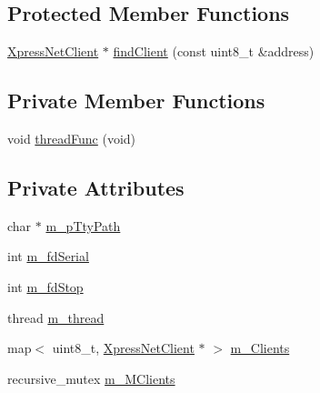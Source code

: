 \subsection*{Protected Member Functions}
\begin{DoxyCompactItemize}
\item 
\hyperlink{classTBT_1_1XpressNetClient}{Xpress\+Net\+Client} $\ast$ \hyperlink{classTBT_1_1XpressNetClientInterface_ac7c05010e7a1cb8fe251c0154ca421d3_ac7c05010e7a1cb8fe251c0154ca421d3}{find\+Client} (const uint8\+\_\+t \&address)
\end{DoxyCompactItemize}
\subsection*{Private Member Functions}
\begin{DoxyCompactItemize}
\item 
void \hyperlink{classTBT_1_1XpressNetClientInterface_a8b49b38dfe0d208f643f7c65d380f31b_a8b49b38dfe0d208f643f7c65d380f31b}{thread\+Func} (void)
\end{DoxyCompactItemize}
\subsection*{Private Attributes}
\begin{DoxyCompactItemize}
\item 
char $\ast$ \hyperlink{classTBT_1_1XpressNetClientInterface_afce6612b04b468e20f8196a73bd16c7b_afce6612b04b468e20f8196a73bd16c7b}{m\+\_\+p\+Tty\+Path}
\item 
int \hyperlink{classTBT_1_1XpressNetClientInterface_a860a0570de71822774ab9d1ff14d459a_a860a0570de71822774ab9d1ff14d459a}{m\+\_\+fd\+Serial}
\item 
int \hyperlink{classTBT_1_1XpressNetClientInterface_a2a7be080da9167700fdaadbba29f1f8e_a2a7be080da9167700fdaadbba29f1f8e}{m\+\_\+fd\+Stop}
\item 
thread \hyperlink{classTBT_1_1XpressNetClientInterface_a7ed370b795990420b49cb201f3cb5c60_a7ed370b795990420b49cb201f3cb5c60}{m\+\_\+thread}
\item 
map$<$ uint8\+\_\+t, \hyperlink{classTBT_1_1XpressNetClient}{Xpress\+Net\+Client} $\ast$ $>$ \hyperlink{classTBT_1_1XpressNetClientInterface_ac064949432059e1c5210c56b43bb1168_ac064949432059e1c5210c56b43bb1168}{m\+\_\+\+Clients}
\item 
recursive\+\_\+mutex \hyperlink{classTBT_1_1XpressNetClientInterface_a22f7ef7cb7428cf26544df1bc336d517_a22f7ef7cb7428cf26544df1bc336d517}{m\+\_\+\+M\+Clients}
\end{DoxyCompactItemize}
